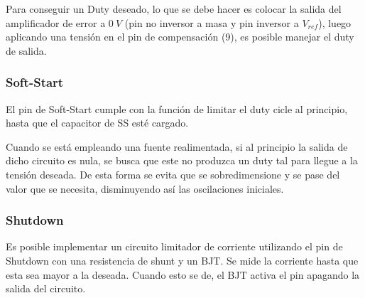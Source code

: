 Para conseguir un Duty deseado, lo que se debe hacer es colocar la salida del amplificador de error a $0 \ V$ (pin no inversor a masa y pin inversor a $V_{ref}$), luego aplicando una tensión en el pin de compensación (9), es posible manejar el duty de salida. 

\subsubsection{Soft-Start}

El pin de Soft-Start cumple con la función de limitar el duty cicle al principio, hasta que el capacitor de SS esté cargado. %

Cuando se está empleando una fuente realimentada, si al principio la salida de dicho circuito es nula, se busca que este no produzca un duty tal para llegue a la tensión deseada. De esta forma se evita que se sobredimensione y se pase del valor que se necesita, disminuyendo así las oscilaciones iniciales.


\subsubsection{Shutdown}

Es posible implementar un circuito limitador de corriente utilizando el pin de Shutdown con una resistencia de shunt y un BJT. Se mide la corriente hasta que esta sea mayor a la deseada. Cuando esto se de, el BJT activa el pin apagando la salida del circuito.

%
